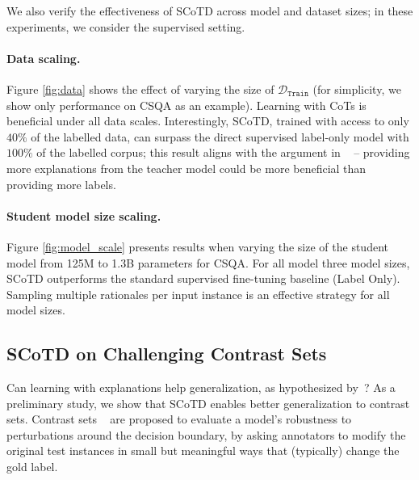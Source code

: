 \documentclass[11pt]{article}
\newcommand{\our}{SCoTD\xspace}
\begin{document}
\label{sec:sec_with_model_and_dataset_scaling}

We also verify the effectiveness of \our across model and dataset sizes; in these experiments, we consider the supervised setting.

\paragraph{Data scaling.} Figure \ref{fig:data} shows the effect of varying the size of $\mathcal{D}_{\texttt{Train}}$ (for simplicity, we show only performance on CSQA as an example). Learning with CoTs is beneficial under all data scales. Interestingly, \our, trained with access to only $40\%$ of the labelled data, can surpass the direct supervised label-only model with $100\%$ of the labelled corpus; this result aligns with the argument in ~\citet{zaidan-etal-2007-using} -- providing more explanations from the teacher model could be more beneficial than providing more labels.

\paragraph{Student model size scaling.} Figure \ref{fig:model_scale} presents results when varying the size of the student model from 125M to 1.3B parameters for CSQA. For all model three model sizes, \our outperforms the standard supervised fine-tuning baseline (Label Only). Sampling multiple rationales per input instance is an effective strategy for all model sizes.



\subsection{SCoTD on Challenging Contrast Sets}

\label{sec:sec_with_contrast_sets}

Can learning with explanations help generalization, as hypothesized by~\citep{zaidan-etal-2007-using}? As a preliminary study, we show that \our enables better generalization to contrast sets. Contrast sets ~\citep{gardner2020evaluating} are proposed to evaluate a model’s robustness to perturbations around the decision boundary, by asking annotators to modify the original test instances in small but meaningful ways that (typically) change the gold label. %
\end{document}
